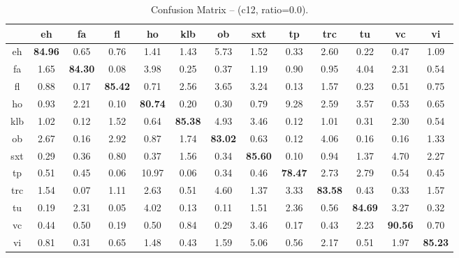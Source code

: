 \begin{table*}[h]
\begin{center}
\caption{Confusion Matrix -- (c12, ratio=0.0).}
\scriptsize
\begin{tabular}{ccccccccccccc}
\hline
   & eh &    fa &   fl &    ho &   klb &    ob &   sxt &    tp &   trc &    tu &    vc &    vi \\
\hline
eh &  \textbf{84.96} &  0.65 &  0.76 &  1.41 &  1.43 &  5.73 &  1.52 &  0.33 &  2.60 &  0.22 &  0.47 &  1.09 \\
fa &   1.65 & \textbf{84.30} &  0.08 &  3.98 &  0.25 &  0.37 &  1.19 &  0.90 &  0.95 &  4.04 &  2.31 &  0.54 \\
fl &   0.88 &  0.17 & \textbf{85.42} &  0.71 &  2.56 &  3.65 &  3.24 &  0.13 &  1.57 &  0.23 &  0.51 &  0.75 \\
ho &   0.93 &  2.21 &  0.10 & \textbf{80.74} &  0.20 &  0.30 &  0.79 &  9.28 &  2.59 &  3.57 &  0.53 &  0.65 \\
klb &   1.02 &  0.12 &  1.52 &  0.64 & \textbf{85.38} &  4.93 &  3.46 &  0.12 &  1.01 &  0.31 &  2.30 &  0.54 \\
ob &   2.67 &  0.16 &  2.92 &  0.87 &  1.74 & \textbf{83.02} &  0.63 &  0.12 &  4.06 &  0.16 &  0.16 &  1.33 \\
sxt &   0.29 &  0.36 &  0.80 &  0.37 &  1.56 &  0.34 & \textbf{85.60} &  0.10 &  0.94 &  1.37 &  4.70 &  2.27 \\
tp &   0.51 &  0.45 &  0.06 & 10.97 &  0.06 &  0.34 &  0.46 & \textbf{78.47} &  2.73 &  2.79 &  0.54 &  0.45 \\
trc &   1.54 &  0.07 &  1.11 &  2.63 &  0.51 &  4.60 &  1.37 &  3.33 & \textbf{83.58} &  0.43 &  0.33 &  1.57 \\
tu &   0.19 &  2.31 &  0.05 &  4.02 &  0.13 &  0.11 &  1.51 &  2.36 &  0.56 & \textbf{84.69} &  3.27 &  0.32 \\
vc &   0.44 &  0.50 &  0.19 &  0.50 &  0.84 &  0.29 &  3.46 &  0.17 &  0.43 &  2.23 & \textbf{90.56} &  0.70 \\
vi &   0.81 &  0.31 &  0.65 &  1.48 &  0.43 &  1.59 &  5.06 &  0.56 &  2.17 &  0.51 &  1.97 & \textbf{85.23} \\
\hline
\end{tabular}
\label{tab:things}
\end{center}
\end{table*}


